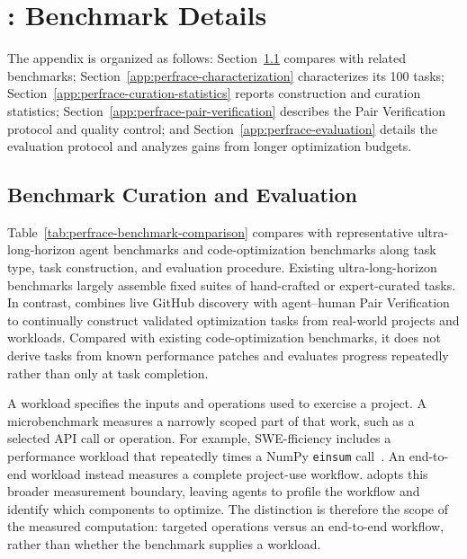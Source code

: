 \section{\perfrace{}: Benchmark Details}
\label{app:perfrace}

The \perfrace{} appendix is organized as follows: Section~\ref{app:perfrace-comparison} compares \perfrace{} with related benchmarks; Section~\ref{app:perfrace-characterization} characterizes its 100 tasks; Section~\ref{app:perfrace-curation-statistics} reports construction and curation statistics; Section~\ref{app:perfrace-pair-verification} describes the Pair Verification protocol and quality control; and Section~\ref{app:perfrace-evaluation} details the evaluation protocol and analyzes gains from longer optimization budgets.

\subsection{Benchmark Curation and Evaluation}
\label{app:perfrace-comparison}

Table~\ref{tab:perfrace-benchmark-comparison} compares \perfrace{} with
representative ultra-long-horizon agent benchmarks and code-optimization
benchmarks along task type, task construction, and evaluation procedure.
Existing ultra-long-horizon benchmarks largely assemble fixed suites of
hand-crafted or expert-curated tasks. In contrast, \perfrace{} combines live
GitHub discovery with agent--human Pair Verification to continually construct
validated optimization tasks from real-world projects and workloads.
Compared with existing code-optimization benchmarks, it does not derive tasks
from known performance patches and evaluates progress repeatedly rather than
only at task completion.

A workload specifies the inputs and operations used to exercise a project.
A microbenchmark measures a narrowly scoped part of that work, such as a
selected API call or operation. For example, SWE-fficiency includes a
performance workload that repeatedly times a NumPy \texttt{einsum}
call~\citep{ma2025swefficiency}.
An end-to-end workload instead measures a complete project-use workflow.
\perfrace{} adopts this broader measurement boundary, leaving agents to
profile the workflow and identify which components to optimize.
The distinction is therefore the scope of the measured computation:
targeted operations versus an end-to-end workflow, rather than whether
the benchmark supplies a workload.




